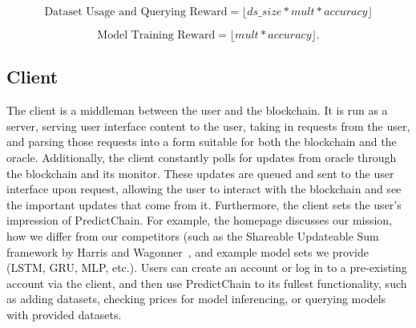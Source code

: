 \documentclass{ledger}
\begin{document}
\begin{equation}
\text{Dataset Usage and Querying Reward} = \lfloor ds\_size * mult * accuracy \rfloor
\end{equation}

\begin{equation}
\text{Model Training Reward} = \lfloor mult * accuracy \rfloor.
\end{equation}

\hfill

\subsection{Client}
The client is a middleman between the user and the blockchain. It is run as a server, serving user interface content to the user, taking in requests from the user, and parsing those requests into a form suitable for both the blockchain and the oracle. Additionally, the client constantly polls for updates from oracle through the blockchain and its monitor. These updates are queued and sent to the user interface upon request, allowing the user to interact with the blockchain and see the important updates that come from it.
Furthermore, the client sets the user's impression of PredictChain. For example, the homepage discusses our mission, how we differ from our competitors (such as the Shareable Updateable Sum framework by Harris and Wagonner~\cite{harris2020leveraging,harris2020analysis,sharingModels}, and example model sets we provide (LSTM, GRU, MLP, etc.). Users can create an account or log in to a pre-existing account via the client, and then use PredictChain to its fullest functionality, such as adding datasets, checking prices for model inferencing, or querying models with provided datasets.

\end{document}
